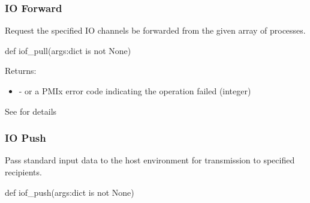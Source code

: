 \subsubsection{IO Forward}

\summary

Request the specified IO channels be forwarded from the given array of processes.

\format

\pyspecificstart
\begin{codepar}
def iof_pull(args:dict is not None)
\end{codepar}
\pyspecificend

\begin{arglist}
\end{arglist}

Returns:
\begin{itemize}
    \item {} -  or a \ac{PMIx} error code indicating the operation failed (integer)
\end{itemize}

See  for details


\subsubsection{IO Push}

\summary

Pass standard input data to the host environment for transmission to specified recipients.

\format

\pyspecificstart
\begin{codepar}
def iof_push(args:dict is not None)
\end{codepar}
\pyspecificend

